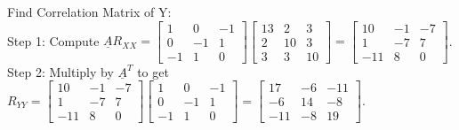\documentclass[12pt]{article}
\begin{document}
\noindent
Find Correlation Matrix of Y: \\
Step 1: Compute $\underline{A}R_{XX} = \begin{bmatrix} 1 & 0 & -1 \\ 0 & -1 & 1 \\ -1 & 1 & 0 \end{bmatrix} \begin{bmatrix} 13 & 2 & 3 \\ 2 & 10 & 3 \\ 3 & 3 & 10 \end{bmatrix} = \begin{bmatrix} 10 & -1 & -7 \\ 1 & -7 & 7 \\ -11 & 8 & 0 \end{bmatrix}$. \\
Step 2: Multiply by $\underline{A}^{T}$ to get $R_{YY} = \begin{bmatrix} 10 & -1 & -7 \\ 1 & -7 & 7 \\ -11 & 8 & 0 \end{bmatrix} \begin{bmatrix} 1 & 0 & -1 \\ 0 & -1 & 1 \\ -1 & 1 & 0 \end{bmatrix} = \begin{bmatrix} 17 & -6 & -11 \\ -6 & 14 & -8 \\ -11 & -8 & 19 \end{bmatrix}$.
\end{document}
